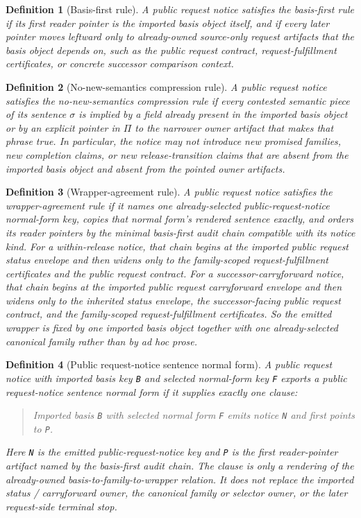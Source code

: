 \documentclass[11pt]{article}
\newtheorem{definition}{Definition}
\begin{document}
\begin{definition}[Basis-first rule]
A public request notice satisfies the \emph{basis-first rule} if its first reader pointer is the imported basis object itself, and if every later pointer moves leftward only to already-owned source-only request artifacts that the basis object depends on, such as the public request contract, request-fulfillment certificates, or concrete successor comparison context.
\end{definition}

\begin{definition}[No-new-semantics compression rule]
A public request notice satisfies the \emph{no-new-semantics compression rule} if every contested semantic piece of its sentence $\sigma$ is implied by a field already present in the imported basis object or by an explicit pointer in $\Pi$ to the narrower owner artifact that makes that phrase true.
In particular, the notice may not introduce new promised families, new completion claims, or new release-transition claims that are absent from the imported basis object and absent from the pointed owner artifacts.
\end{definition}

\begin{definition}[Wrapper-agreement rule]
A public request notice satisfies the \emph{wrapper-agreement rule} if it names one already-selected public-request-notice normal-form key, copies that normal form's rendered sentence exactly, and orders its reader pointers by the minimal basis-first audit chain compatible with its notice kind.
For a within-release notice, that chain begins at the imported public request status envelope and then widens only to the family-scoped request-fulfillment certificates and the public request contract.
For a successor-carryforward notice, that chain begins at the imported public request carryforward envelope and then widens only to the inherited status envelope, the successor-facing public request contract, and the family-scoped request-fulfillment certificates.
So the emitted wrapper is fixed by one imported basis object together with one already-selected canonical family rather than by ad hoc prose.
\end{definition}

\begin{definition}[Public request-notice sentence normal form]
A public request notice with imported basis key \texttt{B} and selected normal-form key \texttt{F} exports a \emph{public request-notice sentence normal form} if it supplies exactly one clause:
\begin{quote}\small
Imported basis \texttt{B} with selected normal form \texttt{F} emits notice \texttt{N} and first points to \texttt{P}.
\end{quote}
Here \texttt{N} is the emitted public-request-notice key and \texttt{P} is the first reader-pointer artifact named by the basis-first audit chain. The clause is only a rendering of the already-owned basis-to-family-to-wrapper relation. It does not replace the imported status / carryforward owner, the canonical family or selector owner, or the later request-side terminal stop.
\end{definition}
\end{document}
